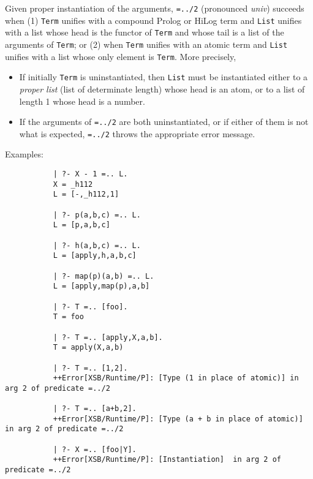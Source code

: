 \begin{description}
%
Given proper instantiation of the arguments, {\tt =../2} (pronounced
{\em univ}) succeeds when (1) {\tt Term} unifies with a compound
Prolog or HiLog term and {\tt List} unifies with a list whose head is
the functor of {\tt Term} and whose tail is a list of the arguments of
{\tt Term}; or (2) when {\tt Term} unifies with an atomic term and
{\tt List} unifies with a list whose only element is {\tt Term}.  More
precisely,
    \begin{itemize}
    \item If initially {\tt Term} is uninstantiated, then {\tt List}
      must be instantiated either to a {\em proper list} (list of
      determinate length) whose head is an atom, or to a list of
      length 1 whose head is a number.
    \item If the arguments of {\tt =../2} are both uninstantiated, or
      if either of them is not what is expected, {\tt =../2} throws
      the appropriate error message.
    \end{itemize}

    Examples:
    {\footnotesize
     \begin{verbatim}
           | ?- X - 1 =.. L.
           X = _h112
           L = [-,_h112,1]

           | ?- p(a,b,c) =.. L.
           L = [p,a,b,c]

           | ?- h(a,b,c) =.. L.
           L = [apply,h,a,b,c]

           | ?- map(p)(a,b) =.. L.
           L = [apply,map(p),a,b]

           | ?- T =.. [foo].
           T = foo

           | ?- T =.. [apply,X,a,b].
           T = apply(X,a,b)

           | ?- T =.. [1,2].
           ++Error[XSB/Runtime/P]: [Type (1 in place of atomic)] in arg 2 of predicate =../2

           | ?- T =.. [a+b,2].
           ++Error[XSB/Runtime/P]: [Type (a + b in place of atomic)] in arg 2 of predicate =../2

           | ?- X =.. [foo|Y].
           ++Error[XSB/Runtime/P]: [Instantiation]  in arg 2 of predicate =../2
     \end{verbatim}}


\end{description}

